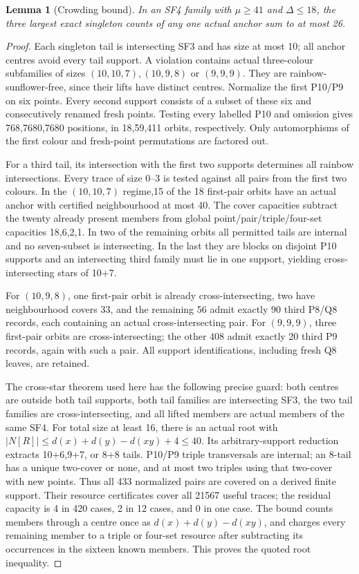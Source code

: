 \documentclass[11pt,a4paper]{article}
\numberwithin{equation}{section}
\newtheorem{lemma}[theorem]{Lemma}
\theoremstyle{remark}
\begin{document}
\begin{lemma}[Crowding bound]\label{lem:crowding26}
In an SF4 family with $\mu\ge 41$ and $\Delta\le 18$, the three largest
exact singleton counts of any one actual anchor sum to at most 26.
\end{lemma}
\begin{proof}
Each singleton tail is intersecting SF3 and has size at most 10; all
anchor centres avoid every tail support. A violation contains actual
three-colour subfamilies of sizes $(10,10,7),(10,9,8)$ or $(9,9,9)$.
They are rainbow-sunflower-free, since their lifts have distinct
centres. Normalize the first P10/P9 on six points. Every second support
consists of a subset of these six and consecutively renamed fresh
points. Testing every labelled P10 and omission gives 768,7680,7680
positions, in 18,59,411 orbits, respectively. Only automorphisms of
the first colour and fresh-point permutations are factored out.

For a third tail, its intersection with the first two supports determines
all rainbow intersections. Every trace of size 0--3 is tested against
all pairs from the first two colours. In the $(10,10,7)$ regime,15 of
the 18 first-pair orbits have an actual anchor with certified
neighbourhood at most 40. The cover capacities subtract the twenty
already present members from global point/pair/triple/four-set
capacities 18,6,2,1. In two of the remaining orbits all permitted tails
are internal and no seven-subset is intersecting. In the last they
are blocks on disjoint P10 supports and an intersecting third family
must lie in one support, yielding cross-intersecting stars of 10+7.

For $(10,9,8)$, one first-pair orbit is already cross-intersecting, two
have neighbourhood covers 33, and the remaining 56 admit exactly 90
third P8/Q8 records, each containing an actual cross-intersecting pair.
For $(9,9,9)$, three first-pair orbits are cross-intersecting; the
other 408 admit exactly 20 third P9 records, again with such a pair.
All support identifications, including fresh Q8 leaves, are retained.

The cross-star theorem used here has the following precise guard: both
centres are outside both tail supports, both tail families are
intersecting SF3, the two tail families are cross-intersecting, and all
lifted members are actual members of the
same SF4. For total size at least 16, there is an actual root with
$|N[R]|\le d(x)+d(y)-d(xy)+4\le 40$. Its arbitrary-support reduction
extracts 10+6,9+7, or 8+8 tails. P10/P9 triple transversals are internal;
an 8-tail has a unique two-cover or none, and at most two triples
using that two-cover with new points. Thus all 433 normalized pairs
are covered on a derived finite support. Their resource certificates
cover all 21567 useful traces; the residual capacity is 4 in 420 cases,
2 in 12 cases, and 0 in one case. The bound counts members through a
centre once as $ d(x)+d(y)-d(xy)$, and charges every remaining member
to a triple or four-set resource after subtracting its occurrences
in the sixteen known members. This proves the quoted root inequality.


\end{proof}
\end{document}
